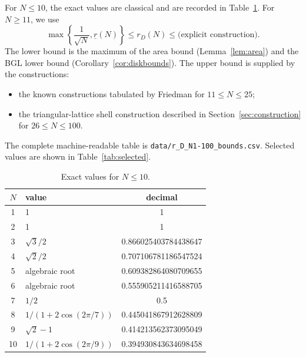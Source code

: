 \documentclass[11pt]{article}
\theoremstyle{definition}
\begin{document}
For $N\le10$, the exact values are classical and are recorded in
Table~\ref{tab:exact}.  For $N\ge11$, we use
\begin{equation}
  \max\left\{\frac1{\sqrt N},\underline r(N)\right\}
  \le
  r_D(N)
  \le
  \text{(explicit construction)}.
  \label{eq:generalbounds}
\end{equation}
The lower bound is the maximum of the area bound
(Lemma~\ref{lem:area}) and the BGL lower bound
(Corollary~\ref{cor:diskbounds}).  The upper bound is supplied by the
constructions:
\begin{itemize}
  \item the known constructions tabulated by Friedman
        \cite{FriedmanCovering} for $11\le N\le25$;
  \item the triangular-lattice shell construction described in
        Section~\ref{sec:construction} for $26\le N\le100$.
\end{itemize}
The complete machine-readable table is
\texttt{data/r\_D\_N1-100\_bounds.csv}.  Selected values are shown in
Table~\ref{tab:selected}.

\begin{table}[ht]
\centering
\caption{Exact values for $N\le10$.}
\label{tab:exact}
\begin{tabular}{@{}c l c@{}}
\toprule
$N$&value&decimal\\
\midrule
1&1&1\\
2&1&1\\
3&$\sqrt3/2$&0.866025403784438647\\
4&$\sqrt2/2$&0.707106781186547524\\
5&algebraic root&0.609382864080709655\\
6&algebraic root&0.555905211416588705\\
7&$1/2$&0.5\\
8&$1/(1+2\cos(2\pi/7))$&0.445041867912628809\\
9&$\sqrt2-1$&0.414213562373095049\\
10&$1/(1+2\cos(2\pi/9))$&0.394930843634698458\\
\bottomrule
\end{tabular}
\end{table}
\end{document}
